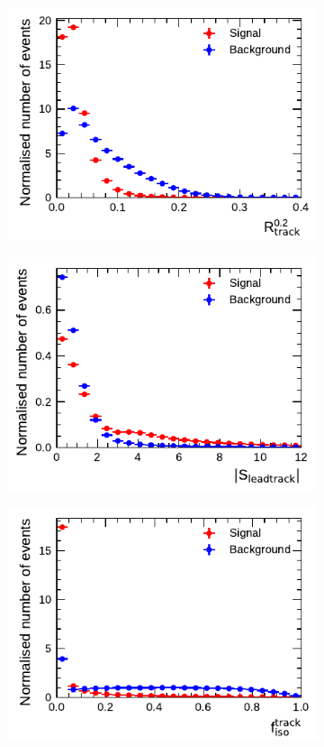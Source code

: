 \begin{figure}[!ht]
  \begin{subfigure}{0.5\textwidth}
    \centering
    \includegraphics{./figures/baseline_bdt_vars/1p/innerTrkAvgDist.pdf}
  \end{subfigure}%
  \begin{subfigure}{0.5\textwidth}
    \centering
    \includegraphics{./figures/baseline_bdt_vars/1p/absipSigLeadTrk.pdf}
  \end{subfigure}
  \begin{subfigure}{0.5\textwidth}
    \centering
    \includegraphics{./figures/baseline_bdt_vars/1p/SumPtTrkFrac.pdf}

\end{subfigure}
\end{figure}

